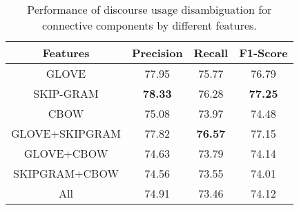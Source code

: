 \begin{table}[h]
\centering
\begin{tabular}{|c|c|c|c|}
\hline

\bf Features        & \bf Precision & \bf Recall & \bf F1-Score \\ \hline
    GLOVE           &     77.95     &     75.77  &     76.79    \\ \hline
    SKIP-GRAM       & \bf 78.33     &     76.28  & \bf 77.25    \\ \hline
    CBOW            &     75.08     &     73.97  &     74.48    \\ \hline
    GLOVE+SKIPGRAM  &     77.82     & \bf 76.57  &     77.15    \\ \hline
    GLOVE+CBOW      &     74.63     &     73.79  &     74.14    \\ \hline
    SKIPGRAM+CBOW   &     74.56     &     73.55  &     74.01    \\ \hline
    All             &     74.91     &     73.46  &     74.12    \\ \hline

\end{tabular}
\caption{\label{t:recognition-vectors} Performance of discourse usage
disambiguation for connective components by different features. }
\end{table}
